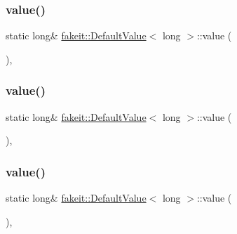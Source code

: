 \subsubsection{\texorpdfstring{value()}{value()}\hspace{0.1cm}{\footnotesize\ttfamily [1/9]}}
{\footnotesize\ttfamily static long\& \mbox{\hyperlink{structfakeit_1_1DefaultValue}{fakeit\+::\+Default\+Value}}$<$ long $>$\+::value (\begin{DoxyParamCaption}{ }\end{DoxyParamCaption})\hspace{0.3cm}{\ttfamily [inline]}, {\ttfamily [static]}}

\mbox{\label{structfakeit_1_1DefaultValue_3_01long_01_4_ab454a57efae429dff77d2c75a0d01c3a}} 
\subsubsection{\texorpdfstring{value()}{value()}\hspace{0.1cm}{\footnotesize\ttfamily [2/9]}}
{\footnotesize\ttfamily static long\& \mbox{\hyperlink{structfakeit_1_1DefaultValue}{fakeit\+::\+Default\+Value}}$<$ long $>$\+::value (\begin{DoxyParamCaption}{ }\end{DoxyParamCaption})\hspace{0.3cm}{\ttfamily [inline]}, {\ttfamily [static]}}

\mbox{\label{structfakeit_1_1DefaultValue_3_01long_01_4_ab454a57efae429dff77d2c75a0d01c3a}} 
\subsubsection{\texorpdfstring{value()}{value()}\hspace{0.1cm}{\footnotesize\ttfamily [3/9]}}
{\footnotesize\ttfamily static long\& \mbox{\hyperlink{structfakeit_1_1DefaultValue}{fakeit\+::\+Default\+Value}}$<$ long $>$\+::value (\begin{DoxyParamCaption}{ }\end{DoxyParamCaption})\hspace{0.3cm}{\ttfamily [inline]}, {\ttfamily [static]}}

